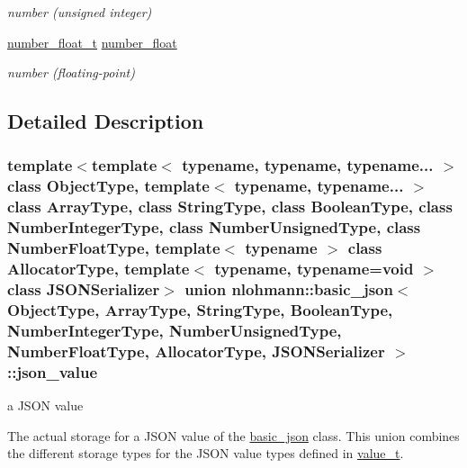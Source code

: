 \begin{DoxyCompactItemize}
\begin{DoxyCompactList}\small\item\em number (unsigned integer) \end{DoxyCompactList}\item 
\hyperlink{classnlohmann_1_1basic__json_a88d6103cb3620410b35200ee8e313d97}{number\+\_\+float\+\_\+t} \hyperlink{unionnlohmann_1_1basic__json_1_1json__value_ad003495e39e78b8096e0b6fc690d146f}{number\+\_\+float}
\begin{DoxyCompactList}\small\item\em number (floating-\/point) \end{DoxyCompactList}\end{DoxyCompactItemize}


\subsection{Detailed Description}
\subsubsection*{template$<$template$<$ typename, typename, typename... $>$ class Object\+Type, template$<$ typename, typename... $>$ class Array\+Type, class String\+Type, class Boolean\+Type, class Number\+Integer\+Type, class Number\+Unsigned\+Type, class Number\+Float\+Type, template$<$ typename $>$ class Allocator\+Type, template$<$ typename, typename=void $>$ class J\+S\+O\+N\+Serializer$>$\newline
union nlohmann\+::basic\+\_\+json$<$ Object\+Type, Array\+Type, String\+Type, Boolean\+Type, Number\+Integer\+Type, Number\+Unsigned\+Type, Number\+Float\+Type, Allocator\+Type, J\+S\+O\+N\+Serializer $>$\+::json\+\_\+value}

a J\+S\+ON value 

The actual storage for a J\+S\+ON value of the \hyperlink{classnlohmann_1_1basic__json}{basic\+\_\+json} class. This union combines the different storage types for the J\+S\+ON value types defined in \hyperlink{classnlohmann_1_1basic__json_ae8cbef097f7da18a781fc86587de6b90}{value\+\_\+t}.

